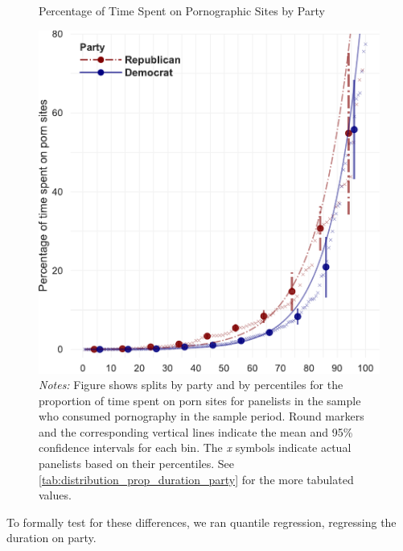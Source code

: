 \documentclass[12pt, letterpaper]{article}
\begin{document}
\begin{figure}[ht]
	\centering
	\caption{Percentage of Time Spent on Pornographic Sites by Party}
	\includegraphics[width=.6\linewidth]{../figs/distribution_proportion_duration_on_adultsites_by_party.pdf}
	\caption*{\footnotesize \emph{Notes:} 
		Figure shows splits by party and by percentiles for the proportion of time spent on porn sites for panelists in the sample who consumed pornography in the sample period.
		Round markers and the corresponding vertical lines indicate the mean and 95\% confidence intervals for each bin.
		The \emph{x} symbols indicate actual panelists based on their percentiles.
		See \cref{tab:distribution_prop_duration_party} for the more tabulated values.
	}
	\label{fig:distribution_prop_duration_party}
\end{figure}


\newpage


To formally test for these differences, we ran quantile regression, regressing the duration on party. 
\end{document}
